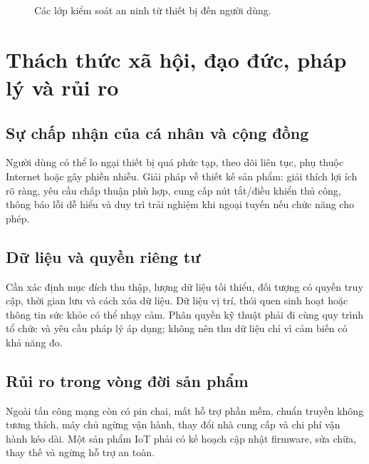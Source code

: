 \begin{figure}[H]\centering
{}\caption{Các lớp kiểm soát an ninh từ thiết bị đến người dùng.}
\end{figure}

\section{Thách thức xã hội, đạo đức, pháp lý và rủi ro}
\subsection{Sự chấp nhận của cá nhân và cộng đồng}
Người dùng có thể lo ngại thiết bị quá phức tạp, theo dõi liên tục, phụ thuộc Internet hoặc gây phiền nhiễu. Giải pháp về thiết kế sản phẩm: giải thích lợi ích rõ ràng, yêu cầu chấp thuận phù hợp, cung cấp nút tắt/điều khiển thủ công, thông báo lỗi dễ hiểu và duy trì trải nghiệm khi ngoại tuyến nếu chức năng cho phép.
\subsection{Dữ liệu và quyền riêng tư}
Cần xác định mục đích thu thập, lượng dữ liệu tối thiểu, đối tượng có quyền truy cập, thời gian lưu và cách xóa dữ liệu. Dữ liệu vị trí, thói quen sinh hoạt hoặc thông tin sức khỏe có thể nhạy cảm. Phân quyền kỹ thuật phải đi cùng quy trình tổ chức và yêu cầu pháp lý áp dụng; không nên thu dữ liệu chỉ vì cảm biến có khả năng đo.
\subsection{Rủi ro trong vòng đời sản phẩm}
Ngoài tấn công mạng còn có pin chai, mất hỗ trợ phần mềm, chuẩn truyền không tương thích, máy chủ ngừng vận hành, thay đổi nhà cung cấp và chi phí vận hành kéo dài. Một sản phẩm IoT phải có kế hoạch cập nhật firmware, sửa chữa, thay thế và ngừng hỗ trợ an toàn.

